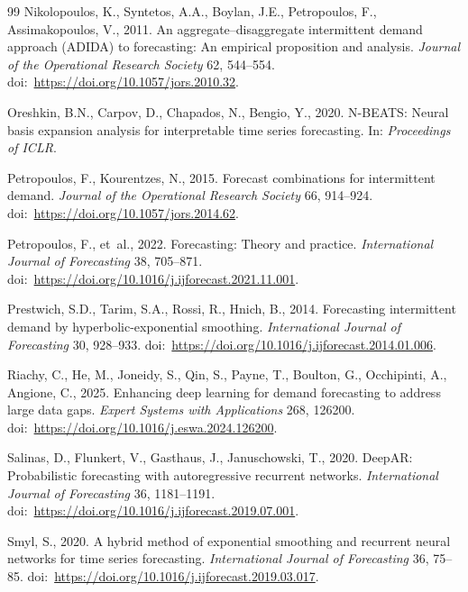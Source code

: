 \documentclass[review,authoryear]{elsarticle}
\begin{document}
\begin{thebibliography}{99}
Nikolopoulos, K., Syntetos, A.A., Boylan, J.E., Petropoulos, F., Assimakopoulos, V., 2011.
An aggregate--disaggregate intermittent demand approach (ADIDA) to forecasting: An empirical proposition and analysis.
\textit{Journal of the Operational Research Society} 62, 544--554.
doi:\ \url{https://doi.org/10.1057/jors.2010.32}.

Oreshkin, B.N., Carpov, D., Chapados, N., Bengio, Y., 2020.
N-BEATS: Neural basis expansion analysis for interpretable time series forecasting.
In: \textit{Proceedings of ICLR}.

Petropoulos, F., Kourentzes, N., 2015.
Forecast combinations for intermittent demand.
\textit{Journal of the Operational Research Society} 66, 914--924.
doi:\ \url{https://doi.org/10.1057/jors.2014.62}.

Petropoulos, F., et~al., 2022.
Forecasting: Theory and practice.
\textit{International Journal of Forecasting} 38, 705--871.
doi:\ \url{https://doi.org/10.1016/j.ijforecast.2021.11.001}.

Prestwich, S.D., Tarim, S.A., Rossi, R., Hnich, B., 2014.
Forecasting intermittent demand by hyperbolic-exponential smoothing.
\textit{International Journal of Forecasting} 30, 928--933.
doi:\ \url{https://doi.org/10.1016/j.ijforecast.2014.01.006}.

Riachy, C., He, M., Joneidy, S., Qin, S., Payne, T., Boulton, G., Occhipinti, A., Angione, C., 2025.
Enhancing deep learning for demand forecasting to address large data gaps.
\textit{Expert Systems with Applications} 268, 126200.
doi:\ \url{https://doi.org/10.1016/j.eswa.2024.126200}.

Salinas, D., Flunkert, V., Gasthaus, J., Januschowski, T., 2020.
DeepAR: Probabilistic forecasting with autoregressive recurrent networks.
\textit{International Journal of Forecasting} 36, 1181--1191.
doi:\ \url{https://doi.org/10.1016/j.ijforecast.2019.07.001}.

Smyl, S., 2020.
A hybrid method of exponential smoothing and recurrent neural networks for time series forecasting.
\textit{International Journal of Forecasting} 36, 75--85.
doi:\ \url{https://doi.org/10.1016/j.ijforecast.2019.03.017}.


\end{thebibliography}
\end{document}
